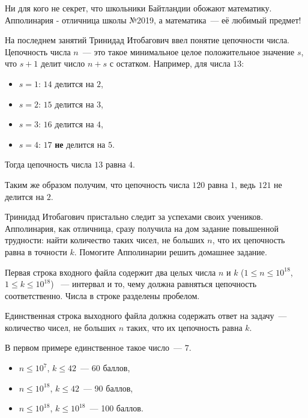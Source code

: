 
\Legend
Ни для кого не секрет, что школьники Байтландии обожают математику. Апполинария - отличница
школы №2019, а математика~--- её любимый предмет!

На последнем занятий Тринидад Итобагович ввел понятие цепочности числа. Цепочность числа $n$~---
это такое минимальное целое положительное значение $s$, что $s + 1$ делит число $n + s$ с остатком.
Например, для числа $13$:
\begin{itemize}
	\item $s = 1$: $14$ делится на $2$,
	\item $s = 2$: $15$ делится на $3$,
	\item $s = 3$: $16$ делится на $4$,
	\item $s = 4$: $17$ \textbf{не} делится на $5$.
\end{itemize}

Тогда цепочность числа $13$ равна $4$.

Таким же образом получим, что цепочность числа $120$ равна $1$, ведь $121$ не делится на $2$.

Тринидад Итобагович пристально следит за успехами своих учеников. Апполинария, как отличница,
сразу получила на дом задание повышенной трудности: найти количество таких чисел, не больших $n$,
что их цепочность равна в точности $k$. Помогите Апполинарии решить домашнее задание.

\Input
Первая строка входного файла содержит два целых числа $n$ и $k$ ($1 \le n \le 10^18$, $1 \le k \le 10^{18}$)
~--- интервал и то, чему должна равняться цепочность соответственно. Числа в строке разделены пробелом.

\Output
Единственная строка выходного файла должна содержать ответ на задачу~--- количество чисел, не больших $n$
таких, что их цепочность равна $k$.

\Samples
\BeginTests
\EndTests

В первом примере единственное такое число~--- $7$.

\Scoring
\begin{itemize}
	\item $n \le 10^7$, $k \le 42$~--- 60 баллов,
	\item $n \le 10^{18}$, $k \le 42$~--- 90 баллов,
	\item $n \le 10^{18}$, $k \le 10^{18}$~--- 100 баллов.
\end{itemize}

\EndProblem
